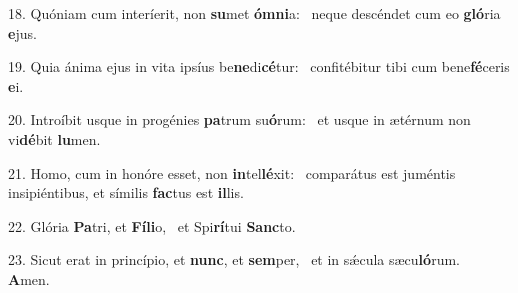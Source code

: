 18. Quóniam cum interíerit, non \textbf{su}met \textbf{óm}\textbf{ni}a: \ast\  neque descéndet cum eo \textbf{gló}ria \textbf{e}jus.\

19. Quia ánima ejus in vita ipsíus be\textbf{ne}di\textbf{cé}tur: \ast\  confitébitur tibi cum bene\textbf{fé}ceris \textbf{e}i.\

20. Introíbit usque in progénies \textbf{pa}trum su\textbf{ó}rum: \ast\  et usque in ætérnum non vi\textbf{dé}bit \textbf{lu}men.\

21. Homo, cum in honóre esset, non \textbf{in}tel\textbf{lé}xit: \ast\  comparátus est juméntis insipiéntibus, et símilis \textbf{fac}tus est \textbf{il}lis.\

22. Glória \textbf{Pa}tri, et \textbf{Fí}\textbf{li}o, \ast\  et Spi\textbf{rí}tui \textbf{Sanc}to.\

23. Sicut erat in princípio, et \textbf{nunc}, et \textbf{sem}per, \ast\  et in sǽcula sæcu\textbf{ló}rum. \textbf{A}men.\

